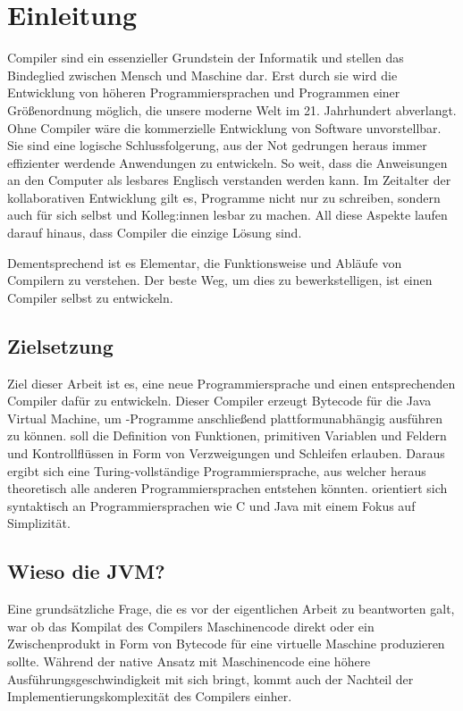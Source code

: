 \chapter{Einleitung}
\label{cha:Einleitung}

Compiler sind ein essenzieller Grundstein der Informatik und stellen das Bindeglied zwischen Mensch und Maschine dar. Erst durch sie wird die Entwicklung von höheren Programmiersprachen und Programmen einer Größenordnung möglich, die unsere moderne Welt im 21. Jahrhundert abverlangt. Ohne Compiler wäre die kommerzielle Entwicklung von Software unvorstellbar. Sie sind eine logische Schlussfolgerung, aus der Not gedrungen heraus immer effizienter werdende Anwendungen zu entwickeln. So weit, dass die Anweisungen an den Computer als lesbares Englisch verstanden werden kann. Im Zeitalter der kollaborativen Entwicklung gilt es, Programme nicht nur zu schreiben, sondern auch für sich selbst und Kolleg:innen lesbar zu machen. All diese Aspekte laufen darauf hinaus, dass Compiler die einzige Lösung sind.

Dementsprechend ist es Elementar, die Funktionsweise und Abläufe von Compilern zu verstehen. Der beste Weg, um dies zu bewerkstelligen, ist einen Compiler selbst zu entwickeln.

\section{Zielsetzung}

Ziel dieser Arbeit ist es, eine neue Programmiersprache und einen entsprechenden Compiler dafür zu entwickeln. Dieser Compiler erzeugt Bytecode für die Java Virtual Machine, um \toya-Programme anschließend plattformunabhängig ausführen zu können. \Toya soll die Definition von Funktionen, primitiven Variablen und Feldern und Kontrollflüssen in Form von Verzweigungen und Schleifen erlauben. Daraus ergibt sich eine Turing-vollständige Programmiersprache, aus welcher heraus theoretisch alle anderen Programmiersprachen entstehen könnten. \Toya orientiert sich syntaktisch an Programmiersprachen wie C und Java mit einem Fokus auf Simplizität.

\section{Wieso die JVM?}

Eine grundsätzliche Frage, die es vor der eigentlichen Arbeit zu beantworten galt, war ob das Kompilat des \toya Compilers Maschinencode direkt oder ein Zwischenprodukt in Form von Bytecode für eine virtuelle Maschine produzieren sollte. Während der native Ansatz mit Maschinencode eine höhere Ausführungsgeschwindigkeit mit sich bringt, kommt auch der Nachteil der Implementierungskomplexität des Compilers einher.

